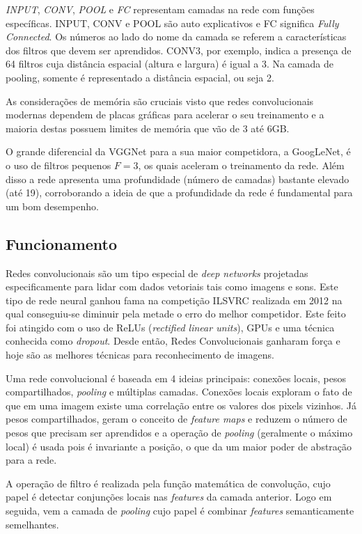 \emph{INPUT}, \emph{CONV}, \emph{POOL} e \emph{FC} representam camadas na rede
com funções específicas. INPUT, CONV e POOL são auto explicativos e FC
significa \emph{Fully Connected}. Os números ao lado do nome da camada se
referem a características dos filtros que devem ser aprendidos. CONV3, por
exemplo, indica a presença de 64 filtros cuja distância espacial (altura e
largura) é igual a 3. Na camada de pooling, somente é representado a distância
espacial, ou seja 2.

As considerações de memória são cruciais visto que redes convolucionais
modernas dependem de placas gráficas para acelerar o seu treinamento e a
maioria destas possuem limites de memória que vão de 3 até 6GB\@.


O grande diferencial da VGGNet para a sua maior competidora, a GoogLeNet, é o
uso de filtros pequenos \emph{$F=3$}, os quais aceleram o treinamento da rede.
Além disso a rede apresenta uma profundidade (número de camadas) bastante
elevado (até 19), corroborando a ideia de que a profundidade da rede é
fundamental para um bom desempenho.

\subsection{Funcionamento}

Redes convolucionais são um tipo especial de \emph{deep networks} projetadas
especificamente para lidar com dados vetoriais tais como imagens e sons.  Este
tipo de rede neural ganhou fama na competição ILSVRC realizada em 2012 na qual
conseguiu-se diminuir pela metade o erro do melhor competidor. Este feito foi
atingido com o uso de ReLUs (\emph{rectified linear units}), GPUs e uma técnica
conhecida como \emph{dropout}. Desde então, Redes Convolucionais ganharam força
e hoje são as melhores técnicas para reconhecimento de
imagens.\cite{lecun2015deep}

Uma rede convolucional é baseada em 4 ideias principais: conexões locais, pesos
compartilhados, \emph{pooling} e múltiplas camadas. Conexões locais exploram o
fato de que em uma imagem existe uma correlação entre os valores dos pixels
vizinhos. Já pesos compartilhados, geram o conceito de \emph{feature maps} e
reduzem o número de pesos que precisam ser aprendidos e a operação de
\emph{pooling} (geralmente o máximo local) é usada pois é invariante a posição,
o que da um maior poder de abstração para a rede.\cite{lecun2015deep}

A operação de filtro é realizada pela função matemática de convolução, cujo
papel é detectar conjunções locais nas \emph{features} da camada anterior. Logo
em seguida, vem a camada de \emph{pooling} cujo papel é combinar
\emph{features} semanticamente semelhantes.\cite{lecun2015deep}

